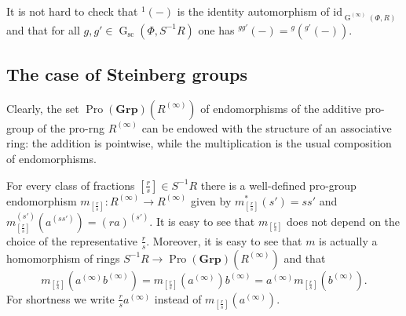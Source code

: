 \documentclass[oneside, 11pt]{amsart}
\numberwithin{equation}{section}
\theoremstyle{definition}
\theoremstyle{remark}
\DeclareMathOperator\Ker{Ker}
\DeclareMathOperator\GG{G}
\DeclareMathOperator{\Pro}{Pro}
\newcommand{\Group}{\mathbf{Grp}}
\newcommand{\otimeshat}{\mathbin{\widehat{\otimes}}}
\newcommand{\up}[2]{{^{#1}\!{#2}}}
\begin{document}
\iffalse
which easily follows from the following commutative diagram (in which \(s_2\) is sufficiently large):
\[\xymatrix@R=48pt@C=72pt@!0{
&
\mkern-36mu S^{-1} R \otimes R^{(ss_1)} &&
S^{-1} R \otimes R^{(ss_1)} \otimeshat S^{-1} R \otimes R^{(ss_1)} \ar[ll] \mkern-18mu & \\
T \ar[dr]_(0.4){\substack{a_i \mapsto\\ (\mathrm{id} \otimes h_1 h_2)(b_i)} \mkern-18mu} \ar[ur]^(0.4){g \otimes h_1 h_2} &
\Ker(\varepsilon) \ar[r]^(0.33){\Delta} \ar[l]_{\mathrm{Coconj}} &
\Ker(\varepsilon) \otimeshat \Ker(\varepsilon) \ar[rr]^(0.55){\mathrm{Coconj} \otimeshat \mathrm{Coconj}} &&
T \otimeshat T \ar[dl]^(0.3){\mkern-18mu \substack{a_i \otimes a_j \mapsto\\ (\mathrm{id} \otimes h_1 \otimeshat \mathrm{id} \otimes h_2)(b_i \otimes b_j)}} \ar[ul]_(0.4){\quad g \otimes h_1 \otimeshat g \otimes h_2} \\
&
\frac R{s_1} \otimes_R R^{(ss_1)} &&
\frac R{s_1} \otimes_R R^{(ss_1)} \otimeshat \frac R{s_1} \otimes_R R^{(ss_1)}. \ar[ll] &
}\]
\fi

It is not hard to check that $\up 1{(-)}$ is the identity automorphism of $\mathrm{id}_{\GG^{(\infty)}(\Phi, R)}$ and that for all \(g, g' \in \GG_{\mathrm{sc}}(\Phi, S^{-1} R)\) one has $\up{gg'}{(-)} = \up{g}{(\up{g'}{(-)})}$.

\subsection{The case of Steinberg groups}
Clearly, the set $\Pro(\Group)(R^{(\infty)})$ of endomorphisms of the additive pro-group of the pro-rng $R^{(\infty)}$ can be endowed with the structure of an associative ring: the addition is 
pointwise, 
while the multiplication is the usual composition of endomorphisms.

For every class of fractions \([\frac rs] \in S^{-1} R\) there is a well-defined pro-group endomorphism \(m_{[\frac rs]} \colon R^{(\infty)} \to R^{(\infty)}\) given by \(m_{[\frac rs]}^*(s') = ss'\) and \(m_{[\frac rs]}^{(s')}(a^{(ss')}) = (ra)^{(s')}\). It is easy to see that $m_{[\frac{r}{s}]}$ does not depend on the choice of the representative \(\tfrac r s\). Moreover, it is easy to see that \(m\) is actually a homomorphism of rings \(S^{-1} R \to \Pro(\Group)(R^{(\infty)})\) and that 
\begin{equation} \label{eq:m-mult} m_{[\frac rs]}(a^{(\infty)} b^{(\infty)}) = m_{[\frac rs]}(a^{(\infty)}) b^{(\infty)} = a^{(\infty)} m_{[\frac rs]}(b^{(\infty)}).\end{equation}
For shortness we write \(\frac rs a^{(\infty)}\) instead of \(m_{[\frac rs]}(a^{(\infty)})\). 
\end{document}
